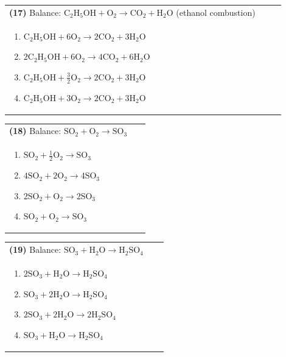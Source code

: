 \documentclass{article}
\begin{document}
\vspace{0.2cm}
\noindent \begin{tabular}{|p{0.9\linewidth}|}
\hline
\vspace{0.2cm}
\textbf{(17)} Balance: \(\mathrm{C_2H_5OH + O_2 \rightarrow CO_2 + H_2O}\) (ethanol combustion)\\
\begin{minipage}[t]{0.85\linewidth}
\begin{enumerate}[label=\alph*.]
   \item \(\mathrm{C_2H_5OH + 6O_2 \rightarrow 2CO_2 + 3H_2O}\)
   \item \(\mathrm{2C_2H_5OH + 6O_2 \rightarrow 4CO_2 + 6H_2O}\)
   \item \(\mathrm{C_2H_5OH + \tfrac{3}{2}O_2 \rightarrow 2CO_2 + 3H_2O}\)
   \item \(\mathrm{C_2H_5OH + 3O_2 \rightarrow 2CO_2 + 3H_2O}\)
\end{enumerate}
\end{minipage}\\
\hline
\end{tabular}

\vspace{0.2cm}
\noindent \begin{tabular}{|p{0.9\linewidth}|}
\hline
\vspace{0.2cm}
\textbf{(18)} Balance: \(\mathrm{SO_2 + O_2 \rightarrow SO_3}\)\\
\begin{minipage}[t]{0.85\linewidth}
\begin{enumerate}[label=\alph*.]
   \item \(\mathrm{SO_2 + \tfrac{1}{2}O_2 \rightarrow SO_3}\)
   \item \(\mathrm{4SO_2 + 2O_2 \rightarrow 4SO_3}\)
   \item \(\mathrm{2SO_2 + O_2 \rightarrow 2SO_3}\)
   \item \(\mathrm{SO_2 + O_2 \rightarrow SO_3}\)
\end{enumerate}
\end{minipage}\\
\hline
\end{tabular}

\vspace{0.2cm}
\noindent \begin{tabular}{|p{0.9\linewidth}|}
\hline
\vspace{0.2cm}
\textbf{(19)} Balance: \(\mathrm{SO_3 + H_2O \rightarrow H_2SO_4}\)\\
\begin{minipage}[t]{0.85\linewidth}
\begin{enumerate}[label=\alph*.]
   \item \(\mathrm{2SO_3 + H_2O \rightarrow H_2SO_4}\)
   \item \(\mathrm{SO_3 + 2H_2O \rightarrow H_2SO_4}\)
   \item \(\mathrm{2SO_3 + 2H_2O \rightarrow 2H_2SO_4}\)
   \item \(\mathrm{SO_3 + H_2O \rightarrow H_2SO_4}\)
\end{enumerate}
\end{minipage}\\
\hline
\end{tabular}
\end{document}
